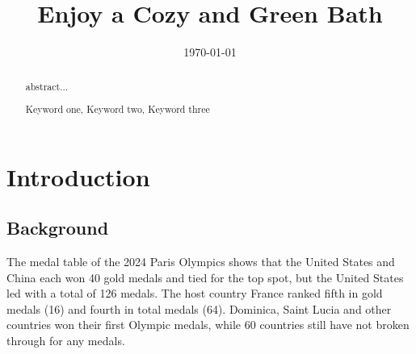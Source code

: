 \documentclass{mcmthesis}
\title{Enjoy a Cozy and Green Bath}
\date{\today}
\begin{document}
	
	\begin{abstract}
		
		abstract...
		
		\begin{keywords}
			Keyword one, Keyword two, Keyword three
		\end{keywords}
		
	\end{abstract}
	
	
	\maketitle
	\tableofcontents        %
	\thispagestyle{empty}
	\newpage
	
	
	
	
	
	
	
	\section{Introduction}
	
	\subsection{Background}
	The medal table of the 2024 Paris Olympics shows that the United States and China each won 40 gold medals and tied for the top spot, but the United States led with a total of 126 medals. The host country France ranked fifth in gold medals (16) and fourth in total medals (64). Dominica, Saint Lucia and other countries won their first Olympic medals, while 60 countries still have not broken through for any medals.
	
\end{document}
